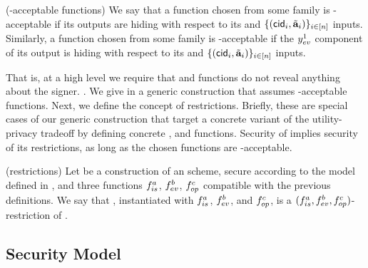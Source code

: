 \begin{definition}{(\UAS-acceptable functions)}
  \label{def:uas-acc-func}
  We say that a \fissue function chosen from some family \famfissue is
  \UAS-acceptable if its outputs are hiding with respect to its \upk and
  $\lbrace(\mathsf{cid}_i,\tilde{\mathbf{a}}_i)\rbrace_{i\in[n]}$ inputs.
  Similarly, a \feval function chosen from some family \famfeval is
  \UAS-acceptable if the $y_{ev}^1$ component of its output is hiding with
  respect to its \upk and $\lbrace(\mathsf{cid}_i,\tilde{\mathbf{a}}_i)\rbrace_{i\in[n]}$ inputs.
\end{definition}

That is, at a high level we require that \fissue and \feval functions do not
reveal anything about the signer. . We give in
a generic \CUASGen construction that assumes \UAS-acceptable functions. Next, we
define the concept of \CUASGen restrictions. Briefly, these are special cases of
our generic construction that target a concrete variant of the utility-privacy
tradeoff by defining concrete \fissue, \feval and \finsp functions. Security of
\CUASGen implies security of its restrictions, as long as the chosen functions
are \CUASGen-acceptable.

\begin{definition}{(\CUASGen restrictions)}
  \label{def:uas-restrictions}
  Let \CUASGen be a construction of an \UAS scheme, secure according to
  the model defined in , and three functions $f_{is}^a$,
  $f_{ev}^b$, $f_{op}^c$ compatible with the previous definitions. We say that
  \CUASGen, instantiated with $f_{is}^a$, $f_{ev}^b$, and $f_{op}^c$, is a
  $(f_{is}^a,f_{ev}^b,f_{op}^c)$-restriction of \CUASGen.
\end{definition}

\subsection{Security Model}
\label{ssec:model-uas}

